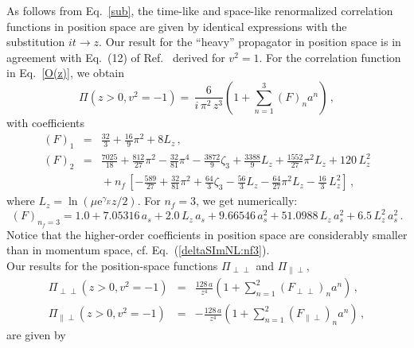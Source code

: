 \documentclass[12pt]{article}
\numberwithin{equation}{section}
\newcommand{\1}[1]{\mathbf{1}^{#1}}
\newcommand{\2}[1]{\mathbf{2}^{#1}}
\newcommand{\3}[1]{\mathbf{3}^{#1}}
\newcommand{\4}[1]{\mathbf{4}^{#1}}
\newcommand{\5}[1]{\mathbf{5}^{#1}}
\newcommand{\EQN}[1]{\hspace{3mm}\fbox{\fbox{$#1$}} \label{#1}}
\newcommand{\mlabel}[1]{ \text{\footnotesize \hspace{3mm}\fbox{\fbox{$#1$}} \label{#1}}}
\renewcommand{\EQN}[1]{\mlabel{#1}}
\renewcommand{\mlabel}[1]{\label{#1}}
\renewcommand{\EQN}[1]{\label{#1}}
\newcommand{\beq}{\begin{equation}}
\newcommand{\eeq}{\end{equation}}
\newcommand{\re}[1]{(\ref{#1})}
\newcommand{\g}{\gamma}
\newcommand{\vv}{v^2}
\newcommand{\TT}{{\perp\perp}}
\newcommand{\PT}{{\parallel\perp}}
\begin{document}
As follows from Eq.~\eqref{sub}, the 
time-like and space-like renormalized correlation functions in position space 
are given by identical expressions with the substitution $it \to z$.
Our result for the ``heavy'' propagator in position space is
in agreement with Eq.~(12) of Ref.~\cite{Chetyrkin:2003vi}
derived for $\vv=1$. 
%
For the correlation function in Eq.~\eqref{O(z)}, we obtain
%
\beq
\Pi(z>0, \vv=-1) =  \, \frac{6}{i\,\pi^2\, z^3} \left( 1 +  \sum_{n=1}^3 \left(F\right)_n  a^n\right)
\mlabel{F:z}
\,,
\eeq
with coefficients
\begin{eqnarray}
 (F)_1&=&
\frac{32}{3}+\frac{16}{9} \pi^2+8 L_z  
\,, %
\nonumber\\
 (F)_2&=&
\frac{7025}{18}+\frac{812}{27} \pi^2-\frac{32}{81} \pi^4-\frac{3872}{9}  \zeta_{3}+\frac{3388}{9} L_z  +\frac{1552}{27} \pi^2 L_z  +120 \, L_z^2
\nonumber\\
&&{}+n_f\, \left[-\frac{589}{27}+\frac{32}{81} \pi^2+\frac{64}{3}  \zeta_{3}-\frac{56}{3} L_z  -\frac{64}{27} \pi^2 L_z  -\frac{16}{3} \, L_z^2\right]
\,,  \EQN{F2}
\end{eqnarray} 
where $L_z = \ln\left(  \mu \mathrm{e}^{\g_E}z/2\right)$. 
For $n_f=3$, we get numerically:
\begin{equation}
(F)_{n_f=3}=1.0+7.05316 \,a_s +2.0\, L_z   \,a_s +9.66546 \, a_s^2 +51.0988\, L_z   \, a_s^2 +6.5 \, L_z^2 \, a_s^2 
\,. \EQN{xFN}
\end{equation}
Notice that the higher-order coefficients in position space are considerably smaller than in momentum space, cf. 
Eq.~\re{deltaSImNL:nf3}. \\
Our results for the position-space functions $\Pi_\TT$ and $\Pi_\PT$, 
\begin{eqnarray}
\Pi_\TT(z>0, \vv=-1) &=& \frac{128\,a}{ z^4} \left( 1 +  \sum_{n=1}^2 \left( F_\TT \right)_n  a^n\right)\,,
\nonumber\\
\Pi_\PT(z>0, \vv=-1) &=& -\frac{128\, a}{ z^4} \left( 1 +  \sum_{n=1}^2 \left( F_\PT \right)_n  a^n\right)\,,
\end{eqnarray}
are given by
\end{document}

